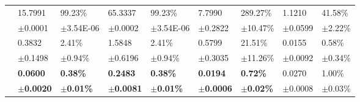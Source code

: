 \documentclass{article}
\newcommand{\pignpi}{PIG'N'PI\xspace}
\begin{document}
\begin{table}[H]
{\begin{tabularx}{1.2\textwidth}{cXXXXXXXX}
        \cline{1-9}\rule{0pt}{2.3ex}
        
        \multirow{2}{*}{GN+}
        & 15.7991 & 99.23\% & 65.3337 & 99.23\% & 7.7990 & 289.27\% & 1.1210 & 41.58\%\\
        &\scriptsize$\pm$0.0001 &\scriptsize$\pm$3.54E-06 &\scriptsize$\pm$0.0002 &\scriptsize$\pm$3.54E-06 &\scriptsize$\pm$0.2822 &\scriptsize$\pm$10.47\% &\scriptsize$\pm$0.0599 &\scriptsize$\pm$2.22\%\\

        \cline{2-9}\rule{0pt}{2.3ex}

        \multirow{2}{*}{GN+\textsubscript{uni}}
        & 0.3832 & 2.41\% & 1.5848 & 2.41\% & 0.5799 & 21.51\% & {0.0155} & {0.58\%}\\
        &\scriptsize$\pm$0.1498 &\scriptsize$\pm$0.94\% &\scriptsize$\pm$0.6196 &\scriptsize$\pm$0.94\% &\scriptsize$\pm$0.3035 &\scriptsize$\pm$11.26\% &\scriptsize{$\pm$0.0092} &\scriptsize{$\pm$0.34\%}\\        
        
        \cline{1-9}\rule{0pt}{2.3ex}

         \multirow{2}{*}{\pignpi}
        & \textbf{0.0600} & \textbf{0.38\%} & \textbf{0.2483} & \textbf{0.38\%} & \textbf{0.0194} & \textbf{0.72\%} & {0.0270} & {1.00\%}\\
        & \scriptsize \textbf{$\pm$0.0020} &\scriptsize \textbf{$\pm$0.01\%} &\scriptsize \textbf{$\pm$0.0081} &\scriptsize \textbf{$\pm$0.01\%} &\scriptsize \textbf{$\pm$0.0006} &\scriptsize \textbf{$\pm$0.02\%} &\scriptsize {$\pm$0.0008} &\scriptsize {$\pm$0.03\%} \\      
      \bottomrule
\end{tabularx}
}
\end{table}
\end{document}
